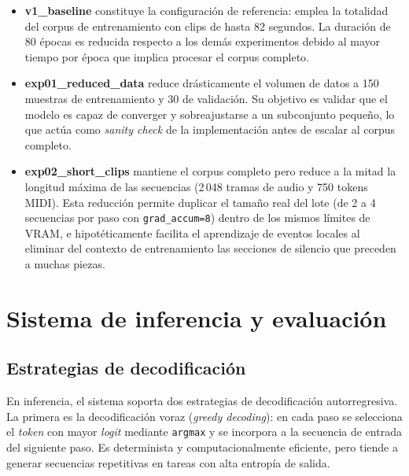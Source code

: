 \begin{itemize}
    \item \textbf{v1\_baseline} constituye la configuración de referencia: emplea
    la totalidad del corpus de entrenamiento con clips de hasta 82 segundos. La
    duración de 80 épocas es reducida respecto a los demás experimentos debido al
    mayor tiempo por época que implica procesar el corpus completo.

    \item \textbf{exp01\_reduced\_data} reduce drásticamente el volumen de datos
    a 150 muestras de entrenamiento y 30 de validación. Su objetivo es validar que
    el modelo es capaz de converger y sobreajustarse a un subconjunto pequeño, lo
    que actúa como \textit{sanity check} de la implementación antes de escalar al
    corpus completo.

    \item \textbf{exp02\_short\_clips} mantiene el corpus completo pero reduce a
    la mitad la longitud máxima de las secuencias (2\,048 tramas de audio y 750
    tokens MIDI). Esta reducción permite duplicar el tamaño real del lote (de 2 a
    4 secuencias por paso con \texttt{grad\_accum=8}) dentro de los mismos límites
    de VRAM, e hipotéticamente facilita el aprendizaje de eventos locales al
    eliminar del contexto de entrenamiento las secciones de silencio que preceden
    a muchas piezas.
\end{itemize}

\clearpage
\section{Sistema de inferencia y evaluación}
\label{sec:inferencia_evaluacion}

\subsection{Estrategias de decodificación}

En inferencia, el sistema soporta dos estrategias de decodificación
autorregresiva. La primera es la decodificación voraz
(\textit{greedy decoding}): en cada paso se selecciona el \textit{token}
con mayor \textit{logit} mediante \texttt{argmax} y se incorpora a la secuencia
de entrada del siguiente paso. Es determinista y computacionalmente
eficiente, pero tiende a generar secuencias repetitivas en tareas con
alta entropía de salida.

